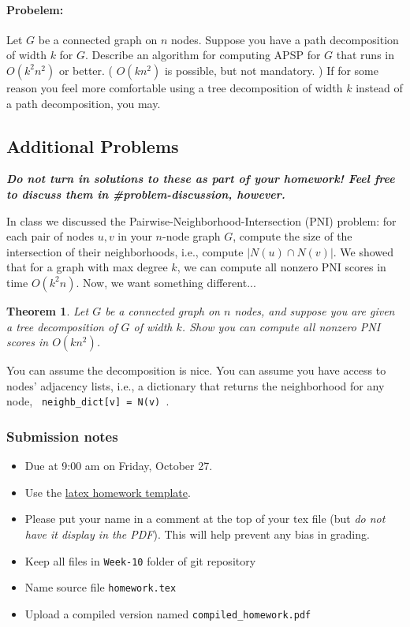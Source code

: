\documentclass{article}
\newtheorem*{theorem}{Theorem}
\begin{document}
\paragraph{Probelem:}
Let $G$ be a connected graph on $n$ nodes. Suppose you have a path decomposition of width $k$ for $G$. Describe an algorithm for computing APSP for $G$ that runs in $O(k^2 n^2)$ or better. ( $O(k n^2)$ is possible, but not mandatory. ) If for some reason you feel more comfortable using a tree decomposition of width $k$ instead of a path decomposition, you may.


\subsection*{Additional Problems}
\textbf{\textit{Do not turn in solutions to these as part of your homework! Feel free to discuss them in \#problem-discussion, however.}}

    In class we discussed the Pairwise-Neighborhood-Intersection (PNI) problem: for each pair of nodes $u, v$ in your $n$-node graph $G$, compute the size of the intersection of their neighborhoods, i.e., compute $| N(u) \cap N(v) |$.
    We showed that for a graph with max degree $k$, we can compute all nonzero PNI scores in time $O( k^2 n)$. Now, we want something different...

\begin{theorem}
    Let $G$ be a connected graph on $n$ nodes, and suppose you are given a tree decomposition of $G$ of width $k$. Show you can compute all nonzero PNI scores in $O(k n^2)$.
\end{theorem}

You can assume the decomposition is nice. You can assume you have access to nodes' adjacency lists, i.e., a dictionary that returns the neighborhood for any node, \verb| neighb_dict[v] = N(v) |.


\vfill

\subsubsection*{Submission notes}
\begin{itemize}
\item Due at 9:00 am on Friday, October 27.
\item Use the \href{https://github.com/bdsullivan/ParameterizedAlgorithms-Fall2017/tree/master/templates/homework}{latex homework template}.
\item Please put your name in a comment at the top of your tex file (but {\it do not
have it display in the PDF}). This will help prevent any bias in grading.
\item Keep all files in \texttt{Week-10} folder of git repository
\item Name source file \texttt{homework.tex}
\item Upload a compiled version named \texttt{compiled\_homework.pdf}
\end{itemize}
\end{document}
